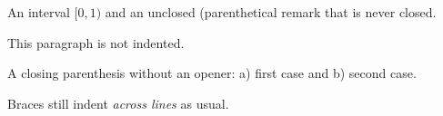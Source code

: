\documentclass{article}
\begin{document}
An interval $[0,1)$ and an unclosed (parenthetical
  remark that is never closed.

This paragraph is not indented.

A closing parenthesis without an opener: a) first case
and b) second case.

Braces still indent \emph{across
lines} as usual.
\end{document}
